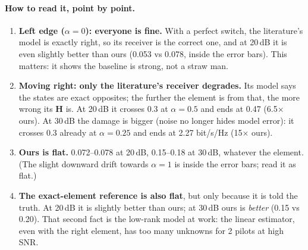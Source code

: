 \documentclass[11pt,a4paper]{article}
\begin{document}
\paragraph{How to read it, point by point.}
\begin{enumerate}
\item \textbf{Left edge ($\alpha=0$): everyone is fine.} With a perfect switch, the literature's model is exactly
right, so its receiver is the correct one, and at 20\,dB it is even slightly better than ours (0.053 vs 0.078, inside the
error bars). This matters: it shows the baseline is strong, not a straw man.
\item \textbf{Moving right: only the literature's receiver degrades.} Its model says the states are exact opposites; the
further the element is from that, the more wrong its $\bm H$ is. At 20\,dB it crosses 0.3 at $\alpha=0.5$ and ends at
0.47 (6.5$\times$ ours). At 30\,dB the damage is bigger (noise no longer hides model error): it crosses 0.3 already at
$\alpha=0.25$ and ends at 2.27 bit/s/Hz (15$\times$ ours).
\item \textbf{Ours is flat.} 0.072--0.078 at 20\,dB, 0.15--0.18 at 30\,dB, whatever the element. (The slight downward drift towards $\alpha=1$ is
inside the error bars; read it as flat.)
\item \textbf{The exact-element reference is also flat}, but only because it is told the truth. At 20\,dB it is slightly
better than ours; at 30\,dB ours is \emph{better} (0.15 vs 0.20). That second fact is the low-rank model at work: the
linear estimator, even with the right element, has too many unknowns for 2 pilots at high SNR.
\end{enumerate}
\end{document}
